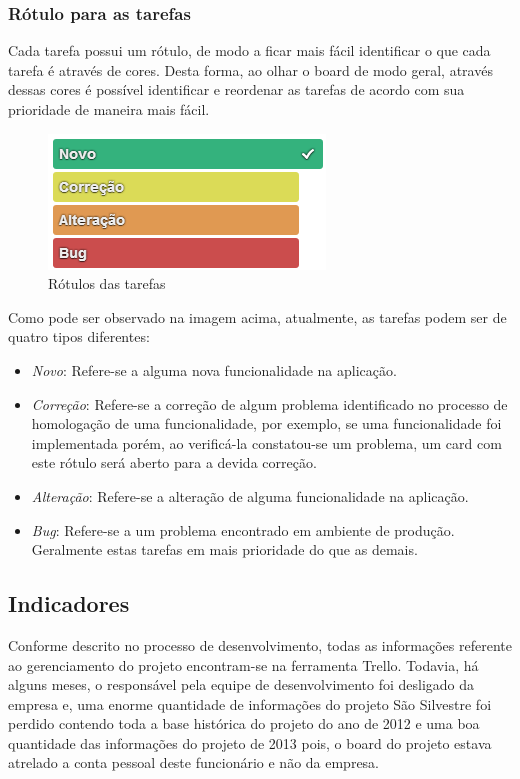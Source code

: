 \documentclass[11pt, a4paper]{article}
\begin{document}
\subsubsection{Rótulo para as tarefas}

Cada tarefa possui um rótulo, de modo a ficar mais fácil identificar o que cada tarefa é através de cores. Desta forma, ao olhar o board de modo geral, através dessas cores é possível identificar e reordenar as tarefas de acordo com sua prioridade de maneira mais fácil.

\begin{figure}[H]
  \caption{Rótulos das tarefas}
  \centering 
  \includegraphics{images/labels.png}
\end{figure}

Como pode ser observado na imagem acima, atualmente, as tarefas podem ser de quatro tipos diferentes:

\begin{itemize}
	\item \textit{Novo}: Refere-se a alguma nova funcionalidade na aplicação.
	\item \textit{Correção}: Refere-se a correção de algum problema identificado no processo de homologação de uma funcionalidade, por exemplo, se uma funcionalidade foi implementada porém, ao verificá-la constatou-se um problema, um card com este rótulo será aberto para a devida correção.
	\item \textit{Alteração}: Refere-se a alteração de alguma funcionalidade na aplicação.
	\item \textit{Bug}: Refere-se a um problema encontrado em ambiente de produção. Geralmente estas tarefas em mais prioridade do que as demais.
\end{itemize}

\subsection{Indicadores}
Conforme descrito no processo de desenvolvimento, todas as informações referente ao gerenciamento do projeto encontram-se na ferramenta Trello. Todavia, há alguns meses, o responsável pela equipe de desenvolvimento foi desligado da empresa e, uma enorme quantidade de informações do projeto São Silvestre foi perdido contendo toda a base histórica do projeto do ano de 2012 e uma boa quantidade das informações do projeto de 2013 pois, o board do projeto estava atrelado a conta pessoal deste funcionário e não da empresa. 
\end{document}
